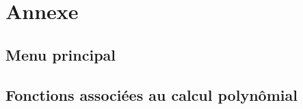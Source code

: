 \documentclass{report}
\begin{document}
  \chapter{Annexe}
    \section{Menu principal}
      
    \newpage
    \section{Fonctions associées au calcul polynômial}
      
      
\end{document}
